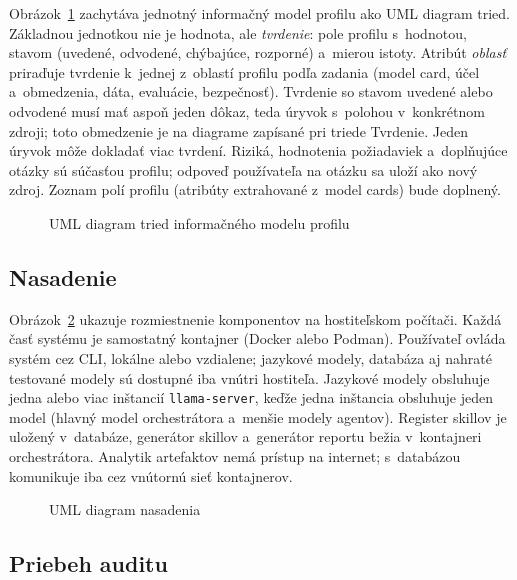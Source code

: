Obrázok~\ref{fig:profil} zachytáva jednotný informačný model profilu ako
UML diagram tried. Základnou jednotkou nie je hodnota, ale
\emph{tvrdenie}: pole profilu s~hodnotou, stavom (uvedené, odvodené,
chýbajúce, rozporné) a~mierou istoty. Atribút \emph{oblasť} priraďuje
tvrdenie k~jednej z~oblastí profilu podľa zadania (model card, účel
a~obmedzenia, dáta, evaluácie, bezpečnosť). Tvrdenie so stavom uvedené
alebo odvodené musí mať aspoň jeden dôkaz, teda úryvok s~polohou
v~konkrétnom zdroji; toto obmedzenie je na diagrame zapísané pri triede
Tvrdenie. Jeden úryvok môže dokladať viac tvrdení. Riziká, hodnotenia
požiadaviek a~doplňujúce otázky sú súčasťou profilu; odpoveď používateľa
na otázku sa uloží ako nový zdroj. Zoznam polí profilu (atribúty
extrahované z~model cards) bude doplnený.

\begin{figure}[ht]
\centering

\caption{UML diagram tried informačného modelu profilu}
\label{fig:profil}
\end{figure}

\subsection{Nasadenie}
\label{sec:nasadenie}

Obrázok~\ref{fig:nasadenie} ukazuje rozmiestnenie komponentov na
hostiteľskom počítači. Každá časť systému je samostatný kontajner (Docker
alebo Podman). Používateľ ovláda systém cez CLI, lokálne alebo vzdialene;
jazykové modely, databáza aj nahraté testované modely sú dostupné iba
vnútri hostiteľa. Jazykové modely obsluhuje jedna alebo viac inštancií
\texttt{llama-server}, keďže jedna inštancia obsluhuje jeden model
(hlavný model orchestrátora a~menšie modely agentov). Register skillov je
uložený v~databáze, generátor skillov a~generátor reportu bežia
v~kontajneri orchestrátora. Analytik artefaktov nemá prístup na internet; s~databázou komunikuje iba
cez vnútornú sieť kontajnerov.

\begin{figure}[ht]
\centering

\caption{UML diagram nasadenia}
\label{fig:nasadenie}
\end{figure}

\subsection{Priebeh auditu}
\label{sec:pipeline}

